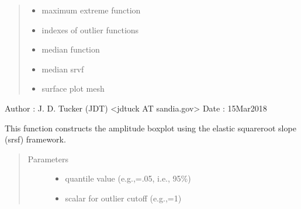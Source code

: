 \documentclass[letterpaper,10pt,english]{sphinxmanual}
\begin{document}
\begin{fulllineitems}
\begin{quote}
\begin{description}
\begin{itemize}
\item {} 
 \textendash{} maximum extreme function

\item {} 
 \textendash{} indexes of outlier functions

\item {} 
 \textendash{} median function

\item {} 
 \textendash{} median srvf

\item {} 
 \textendash{} surface plot mesh

\end{itemize}

\end{description}\end{quote}

Author :  J. D. Tucker (JDT) \textless{}jdtuck AT sandia.gov\textgreater{}
Date   :  15\sphinxhyphen{}Mar\sphinxhyphen{}2018

\begin{fulllineitems}
\label{\detokenize{boxplots:boxplots.ampbox.construct_boxplot}}
This function constructs the amplitude boxplot using the elastic
square\sphinxhyphen{}root slope (srsf) framework.
\begin{quote}\begin{description}
\item[{Parameters}] \leavevmode\begin{itemize}
\item {} 
 \textendash{} quantile value (e.g.,=.05, i.e., 95\%)

\item {} 
 \textendash{} scalar for outlier cutoff (e.g.,=1)

\end{itemize}

\end{description}\end{quote}


\end{fulllineitems}
\end{fulllineitems}
\end{document}
